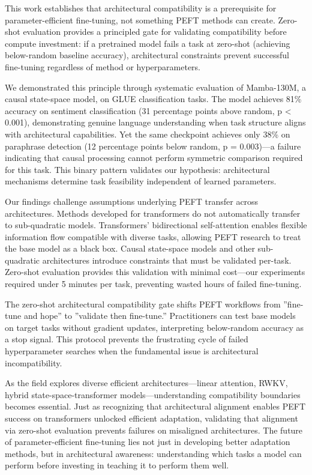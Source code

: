 
This work establishes that architectural compatibility is a prerequisite for parameter-efficient fine-tuning, not something PEFT methods can create. Zero-shot evaluation provides a principled gate for validating compatibility before compute investment: if a pretrained model fails a task at zero-shot (achieving below-random baseline accuracy), architectural constraints prevent successful fine-tuning regardless of method or hyperparameters.

We demonstrated this principle through systematic evaluation of Mamba-130M, a causal state-space model, on GLUE classification tasks. The model achieves 81\% accuracy on sentiment classification (31 percentage points above random, p < 0.001), demonstrating genuine language understanding when task structure aligns with architectural capabilities. Yet the same checkpoint achieves only 38\% on paraphrase detection (12 percentage points below random, p = 0.003)---a failure indicating that causal processing cannot perform symmetric comparison required for this task. This binary pattern validates our hypothesis: architectural mechanisms determine task feasibility independent of learned parameters.

Our findings challenge assumptions underlying PEFT transfer across architectures. Methods developed for transformers do not automatically transfer to sub-quadratic models. Transformers' bidirectional self-attention enables flexible information flow compatible with diverse tasks, allowing PEFT research to treat the base model as a black box. Causal state-space models and other sub-quadratic architectures introduce constraints that must be validated per-task. Zero-shot evaluation provides this validation with minimal cost---our experiments required under 5 minutes per task, preventing wasted hours of failed fine-tuning.

The zero-shot architectural compatibility gate shifts PEFT workflows from ''fine-tune and hope'' to ''validate then fine-tune.'' Practitioners can test base models on target tasks without gradient updates, interpreting below-random accuracy as a stop signal. This protocol prevents the frustrating cycle of failed hyperparameter searches when the fundamental issue is architectural incompatibility.

As the field explores diverse efficient architectures---linear attention, RWKV, hybrid state-space-transformer models---understanding compatibility boundaries becomes essential. Just as recognizing that architectural alignment enables PEFT success on transformers unlocked efficient adaptation, validating that alignment via zero-shot evaluation prevents failures on misaligned architectures. The future of parameter-efficient fine-tuning lies not just in developing better adaptation methods, but in architectural awareness: understanding which tasks a model can perform before investing in teaching it to perform them well.

